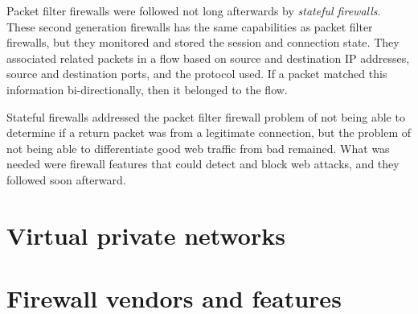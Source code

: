 Packet filter firewalls were followed not long afterwards by \emph{stateful firewalls}.
These second generation firewalls has the same capabilities as packet filter firewalls, but they monitored and stored the session and connection state.
They associated related packets in a flow based on source and destination IP addresses, source and destination ports, and the protocol used.
If a packet matched this information bi-directionally, then it belonged to the flow.

Stateful firewalls addressed the packet filter firewall problem of not being able to determine if a return packet was from a legitimate connection, but the problem of not being able to differentiate good web traffic from bad remained.
What was needed were firewall features that could detect and block web attacks, and they followed soon afterward.




\section{Virtual private networks}
\label{sec:intro-vpn}



\section{Firewall vendors and features}
\label{sec:intro-vendors}

